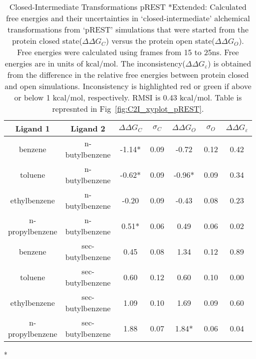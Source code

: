 \begin{table}[!htb]
\centering
\caption{Closed-Intermediate Transformations pREST *Extended:
 Calculated free energies and their uncertainties in `closed-intermediate' alchemical transformations from `pREST' simulations that were started from the protein closed state(\boldmath$\Delta\Delta G_{C}$) versus the protein open state(\boldmath$\Delta\Delta G_{O}$).
 Free energies were calculated using frames from 15 to 25ns. 
 Free energies are in units of kcal/mol.
 The inconsistency(\boldmath$\Delta\Delta G_{\varepsilon}$) is obtained from the difference in the relative free energies between protein closed and open simulations. 
 Inconsistency is highlighted red or green if above or below 1 kcal/mol, respectively.
 RMSI is 0.43 kcal/mol.
 Table is represnted in Fig~\ref{fig:C2I_xyplot_pREST}.
}
\label{tbl:C-I_pRESText}
\begin{tabular}{|c|c|c|c|c|c|c|}
\hline
\textbf{Ligand 1}       & \textbf{Ligand 2}    & \boldmath$\Delta\Delta G_{C}$ & \boldmath$\sigma_{C}$ & \boldmath$\Delta\Delta G_{O}$ & \boldmath$\sigma_{O}$ & \boldmath$\Delta\Delta G_{\varepsilon}$ \\ \hline
benzene          & n-butylbenzene   & -1.14*    & 0.09  & -0.72   & 0.12  & \cellcolor[HTML]{9AFF99}0.42 \\ \hline
toluene          & n-butylbenzene   & -0.62*    & 0.09  & -0.96*  & 0.09  & \cellcolor[HTML]{9AFF99}0.34 \\ \hline
ethylbenzene     & n-butylbenzene   & -0.20     & 0.09  & -0.43   & 0.08  & \cellcolor[HTML]{9AFF99}0.23 \\ \hline
n-propylbenzene  & n-butylbenzene   & 0.51*     & 0.06  & 0.49    & 0.06  & \cellcolor[HTML]{9AFF99}0.02 \\ \hline
benzene          & sec-butylbenzene & 0.45      & 0.08  & 1.34    & 0.12  & \cellcolor[HTML]{9AFF99}0.89 \\ \hline
toluene          & sec-butylbenzene & 0.60      & 0.12  & 0.60    & 0.10  & \cellcolor[HTML]{9AFF99}0.00 \\ \hline
ethylbenzene     & sec-butylbenzene & 1.09      & 0.10  & 1.69    & 0.09  & \cellcolor[HTML]{9AFF99}0.60 \\ \hline
n-propylbenzene  & sec-butylbenzene & 1.88      & 0.07  & 1.84*   & 0.06  & \cellcolor[HTML]{9AFF99}0.04 \\ \hline
\end{tabular}
*
\end{table}


